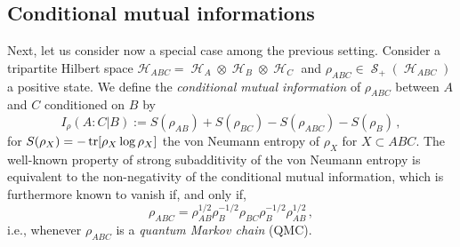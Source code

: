 \documentclass[11pt]{article}
\theoremstyle{newdefinition}
\theoremstyle{newplain}
\theoremstyle{myplain}
\DeclareMathOperator{\cH}{\mathcal{H}}
\DeclareMathOperator{\cS}{\mathcal{S}}
\DeclareMathOperator{\1}{\mathds{1}}
\begin{document}
\subsection{Conditional mutual informations}


Next, let us consider now a special case among the previous setting. Consider a tripartite Hilbert space $\mathcal{H}_{ABC} = \cH_A \otimes \cH_B \otimes \cH_C$ and  $\rho_{ABC} \in \cS_{+}(\cH_{ABC})$ a positive state. We define the \textit{conditional mutual information} of $\rho_{ABC}$ between $A$ and $C$ conditioned on $B$ by
\begin{equation}
    I_{\rho}(A:C | B) := S(\rho_{AB}) +  S(\rho_{BC})- S(\rho_{ABC}) - S(\rho_{B}) \, ,
\end{equation}
for $S(\rho_X) = - \tr[\rho_X \log \rho_X]$ the von Neumann entropy of $\rho_X$ for $X \subset ABC$.
The well-known property of strong subadditivity of the von Neumann entropy \cite{LiebRuskai-Subadditivity-1973} is equivalent to the non-negativity of the conditional mutual information, which is furthermore known \cite{Petz-MonotonicityRelativeEntropy-2003,HaydenJozsaPetzWinter-StrongSubadditivity-2004} to vanish if, and only if, 
\begin{equation}\label{eq:PetzCondition}
    \rho_{ABC} = \rho_{AB}^{1/2} \rho_B^{-1/2} \rho_{BC}  \rho_B^{-1/2}  \rho_{AB}^{1/2} \, ,
\end{equation}
i.e., whenever $\rho_{ABC}$ is a \textit{quantum Markov chain} (QMC). 
\end{document}
